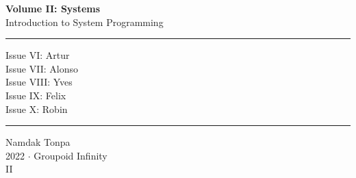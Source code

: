 \documentclass{article}
\begin{document}
\begin{titlepage}
    \centering
    \vspace*{0.5in}
    \Huge
    \textbf{Volume II: Systems} \\
    \LARGE
    Introduction to System Programming \\
    \vspace{1.5in}
    \rule{\textwidth}{0.4pt}
    \flushleft
    \small
    Issue VI: Artur \\
    Issue VII: Alonso \\
    Issue VIII: Yves \\
    Issue IX: Felix \\
    Issue X: Robin \\
    \rule{\textwidth}{0.4pt}
    \centering
    \vfill
    \large
    Namdak Tonpa \\
    \Large
    2022 $\cdot$ Groupoid Infinity \\
    II
\end{titlepage}

\tableofcontents
\newif\ifincludeTOC
\includeTOCfalse
\newpage \begin{standalone}   \end{standalone} %
\newpage \begin{standalone}   \end{standalone}    %
\newpage \begin{standalone}   \end{standalone}    %
\newpage \begin{standalone}   \end{standalone}  %
\newpage \begin{standalone}   \end{standalone}  %
\end{document}
